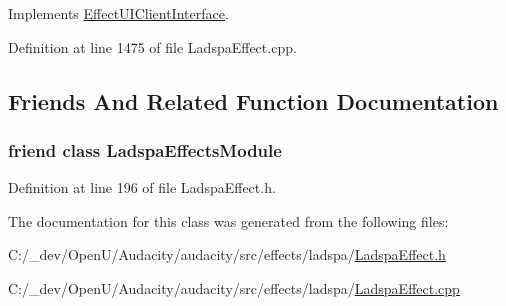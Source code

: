 Implements \hyperlink{class_effect_u_i_client_interface_acb9e8d7c50e97548e9f6235621bbe2bd}{Effect\+U\+I\+Client\+Interface}.



Definition at line 1475 of file Ladspa\+Effect.\+cpp.



\subsection{Friends And Related Function Documentation}
\subsubsection[{\texorpdfstring{Ladspa\+Effects\+Module}{LadspaEffectsModule}}]{\setlength{\rightskip}{0pt plus 5cm}friend class {\bf Ladspa\+Effects\+Module}\hspace{0.3cm}{\ttfamily [friend]}}\hypertarget{class_ladspa_effect_ad8dd0c1bb2abe1932502dbcf4034b77d}{}\label{class_ladspa_effect_ad8dd0c1bb2abe1932502dbcf4034b77d}


Definition at line 196 of file Ladspa\+Effect.\+h.



The documentation for this class was generated from the following files\+:\begin{DoxyCompactItemize}
\item 
C\+:/\+\_\+dev/\+Open\+U/\+Audacity/audacity/src/effects/ladspa/\hyperlink{_ladspa_effect_8h}{Ladspa\+Effect.\+h}\item 
C\+:/\+\_\+dev/\+Open\+U/\+Audacity/audacity/src/effects/ladspa/\hyperlink{_ladspa_effect_8cpp}{Ladspa\+Effect.\+cpp}\end{DoxyCompactItemize}
